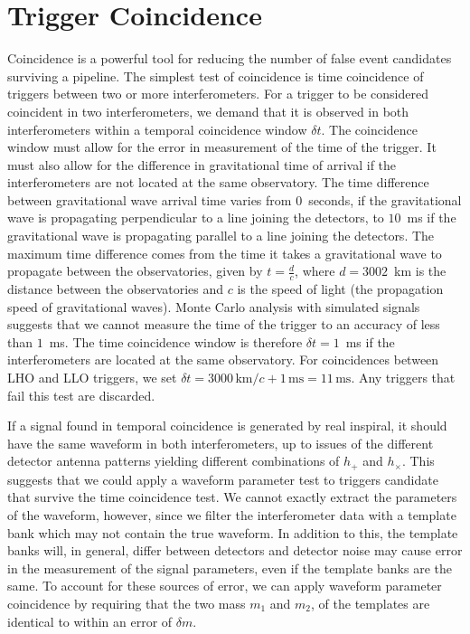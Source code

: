 \section{Trigger Coincidence}
\label{s:coincidence}

Coincidence is a powerful tool for reducing the number of false event
candidates surviving a pipeline. The simplest test of coincidence is time
coincidence of triggers between two or more interferometers.  For a trigger to
be considered coincident in two interferometers, we demand that it is observed
in both interferometers within a temporal coincidence window $\delta t$. The
coincidence window must allow for the error in measurement of the time of the
trigger. It must also allow for the difference in gravitational time of
arrival if the interferometers are not located at the same observatory.  The
time difference between gravitational wave arrival time varies from
$0$~seconds, if the gravitational wave is propagating perpendicular to a line
joining the detectors, to $10$~ms if the gravitational wave is propagating
parallel to a line joining the detectors. The maximum time difference comes
from the time it takes a gravitational wave to propagate between the
observatories, given by $t = \frac{d}{c}$, where $d = 3002$~km is the
distance between the observatories and $c$ is the speed of light
(the propagation speed of gravitational waves).  Monte Carlo analysis with
simulated signals suggests that we cannot measure the time of the trigger to
an accuracy of less than $1$~ms. The time coincidence window is therefore
$\delta t = 1$~ms if the interferometers are located at the same observatory.
For coincidences between LHO and LLO triggers, we set $\delta t =
3000\,\mathrm{km} / c + 1\,\mathrm{ms} = 11\, \mathrm{ms}$. Any triggers
that fail this test are discarded. 

If a signal found in temporal coincidence is generated by real inspiral, it
should have the same waveform in both interferometers, up to issues of the
different detector antenna patterns yielding different combinations of $h_{+}$
and $h_{\times}$. This suggests that we could apply a waveform parameter test
to triggers candidate that survive the time coincidence test. We cannot
exactly extract the parameters of the waveform, however, since we filter the
interferometer data with a template bank which may not contain the true
waveform. In addition to this, the template banks will, in general, differ
between detectors and detector noise may cause error in the measurement of the
signal parameters, even if the template banks are the same. To account for
these sources of error, we can apply waveform parameter coincidence by
requiring that the two mass $m_1$ and $m_2$, of the templates are identical to
within an error of $\delta m$.

